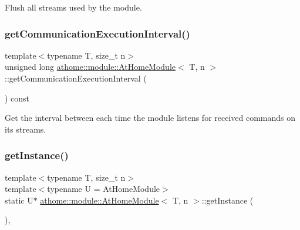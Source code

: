 Flush all streams used by the module. \mbox{\label{classathome_1_1module_1_1_at_home_module_a263fe0bea2fa480b3885fee07e2a8221}} 
\subsubsection{\texorpdfstring{get\+Communication\+Execution\+Interval()}{getCommunicationExecutionInterval()}}
{\footnotesize\ttfamily template$<$typename T, size\+\_\+t n$>$ \\
unsigned long \mbox{\hyperlink{classathome_1_1module_1_1_at_home_module}{athome\+::module\+::\+At\+Home\+Module}}$<$ T, n $>$\+::get\+Communication\+Execution\+Interval (\begin{DoxyParamCaption}{ }\end{DoxyParamCaption}) const\hspace{0.3cm}{\ttfamily [inline]}}

Get the interval between each time the module listens for received commands on its streams. \mbox{\label{classathome_1_1module_1_1_at_home_module_acc6e7fc0d86f11648fd81729484e546f}} 
\subsubsection{\texorpdfstring{get\+Instance()}{getInstance()}}
{\footnotesize\ttfamily template$<$typename T, size\+\_\+t n$>$ \\
template$<$typename U  = At\+Home\+Module$>$ \\
static U$\ast$ \mbox{\hyperlink{classathome_1_1module_1_1_at_home_module}{athome\+::module\+::\+At\+Home\+Module}}$<$ T, n $>$\+::get\+Instance (\begin{DoxyParamCaption}{ }\end{DoxyParamCaption})\hspace{0.3cm}{\ttfamily [inline]}, {\ttfamily [static]}}

